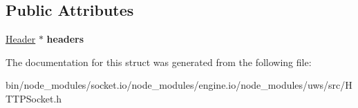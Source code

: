 \subsection*{Public Attributes}
\begin{DoxyCompactItemize}
\item 
\mbox{\label{structu_w_s_1_1_http_request_ac2c05c4cddac92c95680e3942272ec26}} 
\mbox{\hyperlink{structu_w_s_1_1_header}{Header}} $\ast$ {\bfseries headers}
\end{DoxyCompactItemize}


The documentation for this struct was generated from the following file\+:\begin{DoxyCompactItemize}
\item 
bin/node\+\_\+modules/socket.\+io/node\+\_\+modules/engine.\+io/node\+\_\+modules/uws/src/H\+T\+T\+P\+Socket.\+h\end{DoxyCompactItemize}
